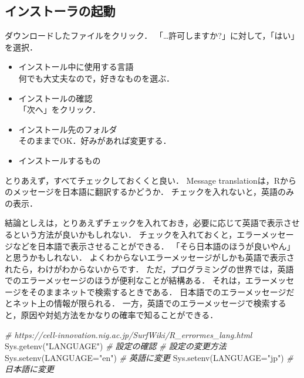 \documentclass[
]{article}
\newenvironment{Shaded}{\begin{snugshade}}{\end{snugshade}}
\newcommand{\AttributeTok}[1]{\textcolor[rgb]{0.77,0.63,0.00}{#1}}
\newcommand{\CommentTok}[1]{\textcolor[rgb]{0.56,0.35,0.01}{\textit{#1}}}
\newcommand{\FunctionTok}[1]{\textcolor[rgb]{0.00,0.00,0.00}{#1}}
\newcommand{\NormalTok}[1]{#1}
\newcommand{\StringTok}[1]{\textcolor[rgb]{0.31,0.60,0.02}{#1}}
\providecommand{\tightlist}{%
  \setlength{\itemsep}{0pt}\setlength{\parskip}{0pt}}
\begin{document}
\hypertarget{ux30a4ux30f3ux30b9ux30c8ux30fcux30e9ux306eux8d77ux52d5}{%
\subsection{インストーラの起動}\label{ux30a4ux30f3ux30b9ux30c8ux30fcux30e9ux306eux8d77ux52d5}}

ダウンロードしたファイルをクリック．
「\ldots 許可しますか?」に対して，「はい」を選択．

\begin{itemize}
\tightlist
\item
  インストール中に使用する言語\\
  何でも大丈夫なので，好きなものを選ぶ．
\end{itemize}

\begin{itemize}
\tightlist
\item
  インストールの確認\\
  「次へ」をクリック．
\end{itemize}

\begin{itemize}
\tightlist
\item
  インストール先のフォルダ\\
  そのままでOK．好みがあれば変更する．
\end{itemize}

\begin{itemize}
\tightlist
\item
  インストールするもの
\end{itemize}

とりあえず，すべてチェックしておくくと良い．
Message translationは，Rからのメッセージを日本語に翻訳するかどうか．
チェックを入れないと，英語のみの表示．

結論としえは，とりあえずチェックを入れておき，必要に応じて英語で表示させるという方法が良いかもしれない．
チェックを入れておくと，エラーメッセージなどを日本語で表示させることができる．
「そら日本語のほうが良いやん」と思うかもしれない．
よくわからないエラーメッセージがしかも英語で表示されたら，わけがわからないからです．
ただ，プログラミングの世界では，英語でのエラーメッセージのほうが便利なことが結構ある．
それは，エラーメッセージをそのままネットで検索するときである．
日本語でのエラーメッセージだとネット上の情報が限られる．
一方，英語でのエラーメッセージで検索すると，原因や対処方法をかなりの確率で知ることができる．

\begin{Shaded}
\begin{Highlighting}[]
  \CommentTok{\# https://cell{-}innovation.nig.ac.jp/SurfWiki/R\_errormes\_lang.html}
  \FunctionTok{Sys.getenv}\NormalTok{(}\StringTok{"LANGUAGE"}\NormalTok{) }\CommentTok{\# 設定の確認}
  \CommentTok{\# 設定の変更方法}
  \FunctionTok{Sys.setenv}\NormalTok{(}\AttributeTok{LANGUAGE=}\StringTok{"en"}\NormalTok{) }\CommentTok{\# 英語に変更}
  \FunctionTok{Sys.setenv}\NormalTok{(}\AttributeTok{LANGUAGE=}\StringTok{"jp"}\NormalTok{) }\CommentTok{\# 日本語に変更}
\end{Highlighting}
\end{Shaded}
\end{document}
